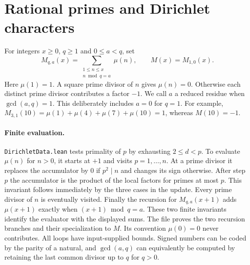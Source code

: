 \section{Rational primes and Dirichlet characters}
\label{sec:dirichlet}
For integers $x\geq 0$, $q\geq1$ and $0\leq a<q$, set
\[
 M_{q,a}(x)=\sum_{\substack{1\leq n\leq x\\n\bmod q=a}}\mu(n),
 \qquad M(x)=M_{1,0}(x).
\]
Here $\mu(1)=1$. A square prime divisor of $n$ gives $\mu(n)=0$.
Otherwise each distinct prime divisor contributes a factor $-1$.
We call $a$ a reduced residue when $\gcd(a,q)=1$. This deliberately
includes $a=0$ for $q=1$. For example,
$M_{3,1}(10)=\mu(1)+\mu(4)+\mu(7)+\mu(10)=1$,
whereas $M(10)=-1$.

\paragraph{Finite evaluation.}
\texttt{DirichletData.lean} tests primality of $p$ by exhausting
$2\leq d<p$. To evaluate $\mu(n)$ for $n>0$, it starts at $+1$ and
visits $p=1,\ldots,n$. At a prime divisor it replaces the accumulator
by $0$ if $p^2\mid n$ and changes its sign otherwise. After step $p$
the accumulator is the product of the local factors for primes at most
$p$. This invariant follows immediately by the three cases in the
update. Every prime divisor of $n$ is eventually visited. Finally the
recursion for $M_{q,a}(x+1)$ adds $\mu(x+1)$ exactly when
$(x+1)\bmod q=a$. These two finite invariants identify the evaluator
with the displayed sums. The file proves the two recursion branches and
their specialization to $M$. Its convention $\mu(0)=0$ never
contributes. All loops have input-supplied bounds. Signed numbers can
be coded by the parity of a natural, and $\gcd(a,q)$ can equivalently
be computed by retaining the last common divisor up to $q$ for $q>0$.

